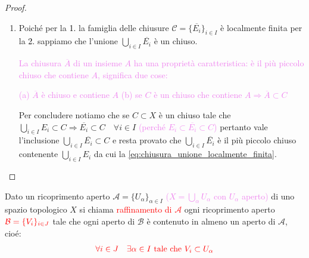 \begin{proof}
\begin{enumerate}
            Se $U$ non incontra alcun elemento della famiglia \textcolor{violet}{$(U \cap E_i=\emptyset \quad \forall i)$} 
            $\displaystyle \Rightarrow U \subset X \setminus \bigcup_{i \in I} C_i$ 
            
            Altrimenti \textcolor{red}{$A := U \setminus \textcolor{violet}{\underbrace{\textcolor{red}{(C_{i_1} \cup \dots \cup C_{i_k})}}_{\substack{\text{unione finita} \\ \text{di chiusi è} \\ \text{un chiuso}}}}$} è un intorno aperto di $x$ 
            \textcolor{violet}{$(x \notin \bigcup_{i \in I} C_i)$} e si ha che
            \textcolor{violet}{(tolti i $C_{i_j}$ gli altri non incontrano $U$)} $A \cap C_i = \emptyset \quad \forall i$
            $\displaystyle \Rightarrow A \subset X \setminus \bigcup_{i \in I} C_i$.
            
            In entrambi i casi $\displaystyle \overset{\text{\textcolor{violet}{rich. \ref{rich:car_aperti}}}}{\Rightarrow} X \setminus \bigcup_{i \in I} C_i$ è aperto.
            \item Poiché per la \textcolor{black}{1.} la famiglia delle chiusure $\mathcal{C} = \{\overline{E_i}\}_{i \in I}$ è localmente finita
            per la \textcolor{black}{2.} sappiamo che l'unione $\displaystyle \bigcup_{i \in I} \overline{E_i}$ è un chiuso. 
            
            \textcolor{violet}{La chiusura $\overline{A}$ di un insieme $A$ ha una proprietà caratteristica: è il più piccolo chiuso che contiene $A$, significa due cose:}

            \textcolor{violet}{(a) $\overline{A}$ è chiuso e contiene $A$ (b) se $C$ è un chiuso che contiene $A \Rightarrow \overline{A} \subset C$}

            Per concludere notiamo che se $C \subset X$ è un chiuso tale che $\displaystyle \bigcup_{i \in I} E_i \subset C \Rightarrow \overline{E_i} \subset C \quad \forall i \in I$
            \textcolor{violet}{(perché $E_i \subset \overline{E_i} \subset C$)} pertanto
            vale l'inclusione $\displaystyle \bigcup_{i \in I} \overline{E_i} \subset C$ e resta provato che $\displaystyle \bigcup_{i \in I} \overline{E_i}$
            è il più piccolo 
            chiuso contenente $\displaystyle \bigcup_{i \in I} E_i$ da cui la \eqref{eq:chiusura_unione_localmente_finita}.
        \end{enumerate}
        \end{proof}
        \newpage
        \begin{definizione}
        \label{def:raffinamento}
        \mbox{}

        Dato un ricoprimento aperto $\mathcal{A} = \{U_\alpha\}_{\alpha \in I}$ \textcolor{violet}{($X=\bigcup_\alpha U_\alpha$ con $U_\alpha$ aperto)} di uno spazio topologico $X$ si chiama 
        \textcolor{red}{raffinamento di $\mathcal{A}$} ogni ricoprimento aperto $\textcolor{red}{\mathcal{B} = \{V_i\}_{i \in J}}$ tale che ogni aperto di $\mathcal{B}$
        è contenuto in almeno un aperto di $\mathcal{A}$, cioé:
        \[
        \color{red} \forall i \in J \quad \exists \alpha \in I \text{ tale che } V_i \subset U_\alpha
        \]
        \end{definizione}
